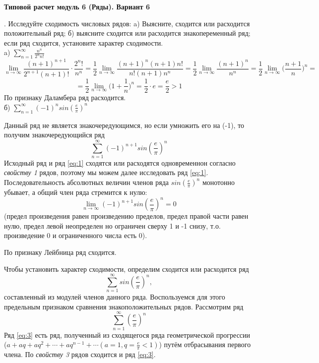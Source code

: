 \documentclass[11pt]{article}
\begin{document}
 
\begin{center}
\begin{Large}
\textbf{Типовой расчет модуль 6 (Ряды). Вариант 6} \\
\end{Large}
\end{center}
.
 Исследуйте сходимость числовых рядов: a) Выясните, сходится или расходится положительный ряд; б) выясните сходится или расходится знакопеременный ряд; если ряд сходится, установите характер сходимости. \\
 
 a) $\sum_{n=1}^{\infty} \frac{n^n}{2^nn!}$
\[\lim\limits_{n \to \infty} \frac{(n+1)^{n+1}}{2^{n+1}(n+1)!}\cdot \frac{2^n!}{n^n} = \frac{1}{2}\lim\limits_{n \to \infty} \frac{(n+1)^n(n+1)n!}{n!(n+1)n^n} = \frac{1}{2}\lim\limits_{n \to \infty}\frac{(n+1)^n}{n^n} = \frac{1}{2}\lim\limits_{n \to \infty}\Big(\frac{n+1}{n}\Big)^n =  \]
\[= \frac{1}{2}\lim\limits_{n \to \infty}\Big(1+ \frac{1}{n} \Big)^n = \frac{1}{2}\cdot e = \frac{e}{2} > 1\]
По признаку Даламбера ряд расходится.\\

 б) $\sum_{n=1}^{\infty} (-1)^nsin(\frac{e}{\pi})^n $
 
Данный ряд не является знакочередующимся, но если умножить его на (-1), то получим знакочередующийся ряд 
\begin{equation}
\sum_{n = 1}^\infty (-1)^{n + 1} sin (\frac{e}{\pi})^n \label{eq:1}
\end{equation}
Исходный ряд и ряд \eqref{eq:1} сходятся или расходятся одновременнон согласно \textit{свойству 1} рядов, поэтому мы можем далее исследовать ряд \eqref{eq:1}.
Последовательность абсолютных величин членов ряда $sin(\frac{e}{\pi})^n$ монотонно убывает, а общий член ряда стремится к нулю:
\[\lim\limits_{n \to \infty} (-1)^{n+1} sin(\frac{e}{\pi})^n = 0 \]
(предел произведения равен произведению пределов, предел правой части равен нулю, предел левой неопределен но ограничен сверху 1 и -1 снизу, т.о. произведение 0 и ограниченного числа есть 0).

По признаку Лейбница ряд сходится.

Чтобы установить характер сходимости, определим сходится или расходится ряд \\
\begin{equation}
\sum_{n=1}^\infty sin(\frac{e}{\pi})^n, \label{eq:2}
\end{equation} составленный из модулей членов данного ряда.
Воспользуемся для этого предельным признаком сравнения знакоположительных рядов.
Рассмотрим ряд 
\begin{equation}
\sum_{n=1}^\infty (\frac{e}{\pi})^n \label{eq:3}
\end{equation}
Ряд \eqref{eq:3} есть ряд, полученный из сходящегося ряда геометрической прогрессии ($a + aq + aq^2 + \cdots + aq^{n-1} + \cdots (a = 1, q = \frac{e}{\pi} < 1)$) путём отбрасывания первого члена. По \textit{свойству 3} рядов сходится и ряд \eqref{eq:3}.
\end{document}
